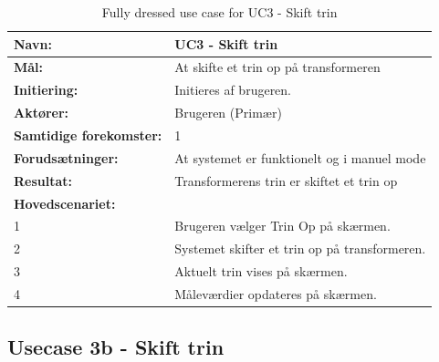 \begin{table}[H]
	\centering
	
	\begin{threeparttable}
		\begin{tabularx}{\linewidth}{ l X }
			\toprule
			\bfseries{Navn:}				& UC3 - Skift trin  \\
			\midrule
			\bfseries{Mål:} 				& At skifte et trin op på transformeren \\
			\midrule
			\bfseries{Initiering:} 			& Initieres af brugeren. \\
			\midrule
			\bfseries{Aktører:} 			& Brugeren (Primær) \\
			\midrule
			\bfseries{Samtidige forekomster:} & 1 \\
			\midrule
			\bfseries{Forudsætninger:} 		& At systemet er funktionelt og i manuel mode\\
			\midrule
			\bfseries{Resultat:} 			& Transformerens trin er skiftet et trin op \\
			\midrule
			\bfseries{Hovedscenariet:} 	& \\
			
			
			1 	& Brugeren vælger Trin Op på skærmen.\\
			2 	& Systemet skifter et trin op på transformeren.\\
			3 	& Aktuelt trin vises på skærmen.\\
			4 	& Måleværdier opdateres på skærmen.\\		
			
			\bottomrule
			
		\end{tabularx}
	\end{threeparttable}
	\caption{Fully dressed use case for UC3 - Skift trin}
	\label{table:UC3}
\end{table}

\subsection{Usecase 3b - Skift trin}


